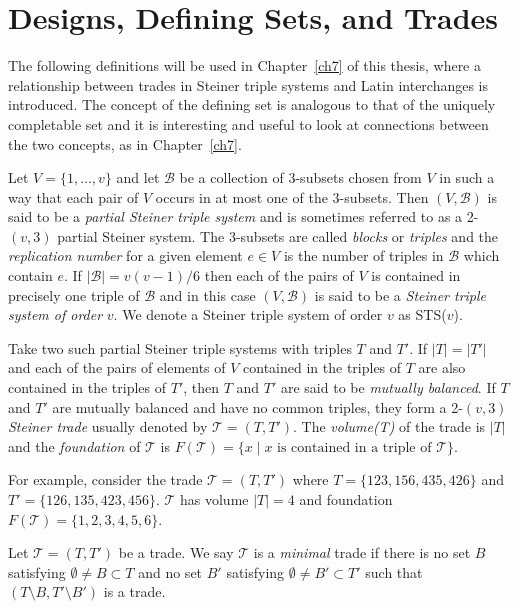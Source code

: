 \documentclass[12pt]{report}
\begin{document}
\section{Designs, Defining Sets, and Trades}
The following definitions will be used in Chapter~\ref{ch7} of this thesis,
where a relationship between trades in Steiner triple systems and Latin
interchanges is introduced.  The concept of the defining set is analogous
to that of the uniquely completable set and it is interesting and useful
to look at connections between the two concepts, as in Chapter~\ref{ch7}.

Let $V=\{1,\dots, v\}$  and let ${\mathcal B}$  be a  collection of 
$3$-subsets chosen from $V$ in such a way that each pair of $V$ 
occurs in at most  one of the $3$-subsets. Then $(V,{\mathcal B})$ is 
said to be a  {\em partial Steiner triple system}  and is sometimes 
referred to as a 2-$(v,3)$ partial Steiner system. The $3$-subsets 
are called {\em blocks} or {\em triples} and the {\em replication number} 
for a given element $e\in V$ is the number of triples in $\mathcal{B}$ which contain $e$.
If  $|{\mathcal B}|=v(v-1)/6$ then each of the pairs of $V$ is 
contained in precisely one triple of ${\mathcal B}$  and in this 
case $(V,{\mathcal B})$ is said to be a {\em Steiner triple system of 
order} $v$.   We denote a Steiner triple system of order $v$ as STS($v$).


Take two such partial Steiner triple systems with triples $T$ and $T'$. If $|T|=|T'|$ and each of the pairs of elements of $V$ contained in the triples of $T$ are also contained in the triples of $T'$, then $T$ and $T'$ are said to be {\em mutually balanced}. If $T$ and $T'$ are mutually balanced and have no common triples,  they form a 2-$(v,3)$ {\em Steiner trade} usually denoted by ${\mathcal T}=(T,T')$. The {\em volume(T)} of the trade is $|T|$
and the {\em foundation} of ${\mathcal T}$ is 
$F({\mathcal T})=\{x\mid x \mbox{ is contained in a triple of } \mathcal{T}\}$. 

For example, consider the trade
${\mathcal T}=(T,T')$ 
where $T=\{1 2 3, 1 5 6, 4 3 5, 4 2 6\}$ 
and $T'=\{1 2 6, 1 3 5, 4 2 3, 4 5 6\}$.
${\mathcal T}$ has volume $|T|=4$ and foundation 
$F({\mathcal T})=\{1,2,3,4,5,6\}$.

Let ${\mathcal T}=(T,T')$ be a trade. We say ${\mathcal T}$ is a
{\it minimal} trade if there is no set $B$ satisfying $\emptyset\neq B\subset 
T$ and no set $B'$ satisfying $\emptyset\neq B'\subset T'$ such that
$(T\setminus B, T'\setminus B')$ is a trade.
\end{document}
